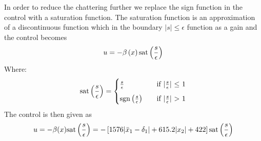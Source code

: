 In order to reduce the chattering further we replace the sign function in the control with a saturation function. The saturation function is an approximation of a discontinuous function which in the boundary $\vert s \vert \leq \epsilon$ function as a gain and the control becomes
\begin{equation}
  u = -\beta\left( x \right) \mathrm{sat}\left( \frac{s}{\epsilon} \right)
\end{equation}
Where:
\begin{equation}
  \mathrm{sat}\left( \frac{s}{\epsilon} \right) =
  \begin{cases}
    \frac{s}{\epsilon} &\quad \text{if $\vert\frac{s}{\epsilon}\vert$ $\leq$ 1} \\[2mm]
    \mathrm{sgn}\left( \frac{s}{\epsilon} \right) &\quad \text{if $\vert \frac{s}{\epsilon}\vert$ $>$ 1}
  \end{cases}
\end{equation}
The control is then given as
\begin{equation}
        u = -\beta(x)\mathrm{sat}\left(\frac{s}{\epsilon}\right) =  -\left[ 1576 \vert \bar{x}_1-\delta_1 \vert + 615.2\vert x_2 \vert + 422 \right]\mathrm{sat}\left(\frac{s}{\epsilon}\right)
\end{equation}
